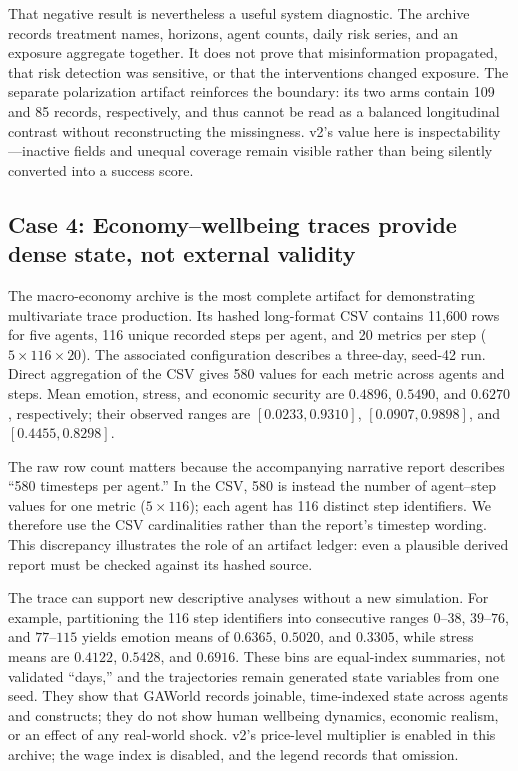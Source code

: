 That negative result is nevertheless a useful system diagnostic.  The
archive records treatment names, horizons, agent counts, daily risk
series, and an exposure aggregate together.  It does not prove that
misinformation propagated, that risk detection was sensitive, or that
the interventions changed exposure.  The separate polarization artifact
reinforces the boundary: its two arms contain 109 and 85 records,
respectively, and thus cannot be read as a balanced longitudinal
contrast without reconstructing the missingness.  v2's value here is
inspectability---inactive fields and unequal coverage remain visible
rather than being silently converted into a success score.

\subsection{Case 4: Economy--wellbeing traces provide dense state, not external validity}

The macro-economy archive is the most complete artifact for demonstrating
multivariate trace production.  Its hashed long-format CSV contains
11{,}600 rows for five agents, 116 unique recorded steps per agent, and
20 metrics per step ($5\times116\times20$).  The associated
configuration describes a three-day, seed-42 run.  Direct aggregation of
the CSV gives 580 values for each metric across agents and steps.  Mean
emotion, stress, and economic security are $0.4896$, $0.5490$, and
$0.6270$, respectively; their observed ranges are $[0.0233, 0.9310]$,
$[0.0907, 0.9898]$, and $[0.4455, 0.8298]$.

The raw row count matters because the accompanying narrative report
describes ``580 timesteps per agent.''  In the CSV, 580 is instead the
number of agent--step values for one metric ($5\times116$); each agent
has 116 distinct step identifiers.  We therefore use the CSV
cardinalities rather than the report's timestep wording.  This
discrepancy illustrates the role of an artifact ledger: even a plausible
derived report must be checked against its hashed source.

The trace can support new descriptive analyses without a new simulation.
For example, partitioning the 116 step identifiers into consecutive
ranges $0$--$38$, $39$--$76$, and $77$--$115$ yields emotion means of
$0.6365$, $0.5020$, and $0.3305$, while stress means are $0.4122$,
$0.5428$, and $0.6916$.  These bins are equal-index summaries, not
validated ``days,'' and the trajectories remain generated state
variables from one seed.  They show that GAWorld records joinable,
time-indexed state across agents and constructs; they do not show
human wellbeing dynamics, economic realism, or an effect of any
real-world shock.  v2's price-level multiplier is enabled in this
archive; the wage index is disabled, and the legend records that
omission.

